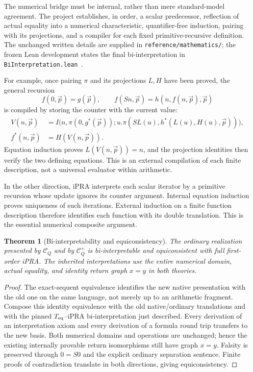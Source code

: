 \documentclass[11pt]{article}
\newtheorem{theorem}{Theorem}[section]
\theoremstyle{definition}
\newcommand{\CQ}{\mathcal C_Q}
\newcommand{\CQp}{\mathcal C_Q^{+}}
\newcommand{\Teq}{T_{\rm eq}}
\begin{document}
The numerical bridge must be internal, rather than mere standard-model
agreement. The project establishes, in order, a scalar predecessor, reflection
of actual equality into a numerical characteristic, quantifier-free induction,
pairing with its projections, and a compiler for each fixed primitive-recursive
definition. The unchanged written details are supplied in
\texttt{reference/mathematics/}; the frozen Lean development states the final
bi-interpretation in \texttt{BiInterpretation.lean}~\cite{biinterp}.

For example, once pairing $\pi$ and its projections $L,H$ have been proved,
the general recursion
\[
 f(0,\vec p)=g(\vec p),\qquad
 f(Sn,\vec p)=h(n,f(n,\vec p),\vec p)
\]
is compiled by storing the counter with the current value:
\begin{align*}
 V(n,\vec p)&=I\bigl(n,\pi(0,g^*(\vec p));
       u.\pi(SL(u),h^*(L(u),H(u),\vec p))\bigr),\\
 f^*(n,\vec p)&=H(V(n,\vec p)).
\end{align*}
Equation induction proves $L(V(n,\vec p))=n$, and the projection identities
then verify the two defining equations. This is an external compilation of
each finite description, not a universal evaluator within arithmetic.

In the other direction, iPRA interprets each scalar iterator by a primitive
recursion whose update ignores its counter argument. Internal equation
induction proves uniqueness of such iterations. External induction on a
finite function description therefore identifies each function with its
double translation. This is the essential numerical composite argument.

\begin{theorem}[Bi-interpretability and equiconsistency]
The ordinary realization presented by $\CQ$ and by $\CQp$ is bi-interpretable
and equiconsistent with full first-order iPRA. The inherited interpretations
use the entire numerical domain, actual equality, and identity return graph
$x=y$ in both theories.
\end{theorem}
\begin{proof}
The exact-sequent equivalence identifies the new native presentation with
the old one on the same language, not merely up to an arithmetic fragment.
Compose this identity equivalence with the old native/ordinary translations
and with the pinned $\Teq$--iPRA bi-interpretation just described. Every
derivation of an interpretation axiom and every derivation of a formula
round trip transfers to the new basis. Both numerical domains and operations
are unchanged; hence the existing internally provable return isomorphisms
still have graph $x=y$. Falsity is preserved through $0=S0$ and the explicit
ordinary separation sentence. Finite proofs of contradiction translate in
both directions, giving equiconsistency.
\end{proof}
\end{document}
